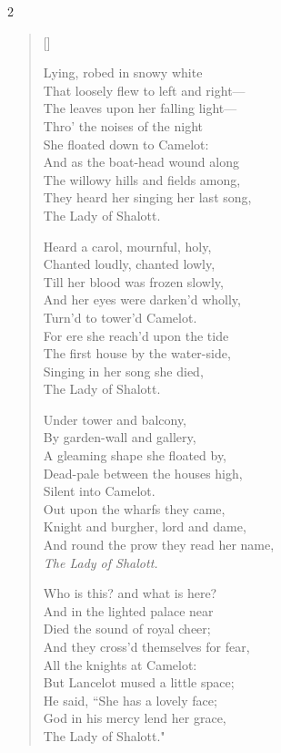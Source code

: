 \begin{paracol}{2}
\begin{verse}[\versewidth]
\begin{patverse}
Lying, robed in snowy white\\
That loosely flew to left and right—\\
The leaves upon her falling light—\\
Thro' the noises of the night\\
She floated down to Camelot:\\
And as the boat-head wound along\\
The willowy hills and fields among,\\
They heard her singing her last song,\\
The Lady of Shalott.
\end{patverse}

\begin{patverse}
Heard a carol, mournful, holy,\\
Chanted loudly, chanted lowly,\\
Till her blood was frozen slowly,\\
And her eyes were darken'd wholly,\\
Turn'd to tower'd Camelot.\\
For ere she reach'd upon the tide\\
The first house by the water-side,\\
Singing in her song she died,\\
The Lady of Shalott.
\end{patverse}

\begin{patverse}
Under tower and balcony,\\
By garden-wall and gallery,\\
A gleaming shape she floated by,\\
Dead-pale between the houses high,\\
Silent into Camelot.\\
Out upon the wharfs they came,\\
Knight and burgher, lord and dame,\\
And round the prow they read her name,\\
\emph{The Lady of Shalott.}
\end{patverse}

\begin{patverse}
Who is this? and what is here?\\
And in the lighted palace near\\
Died the sound of royal cheer;\\
And they cross'd themselves for fear,\\
All the knights at Camelot:\\
But Lancelot mused a little space;\\
He said, ``She has a lovely face;\\
God in his mercy lend her grace,\\
The Lady of Shalott."
\end{patverse}
\end{verse}
\end{paracol}
